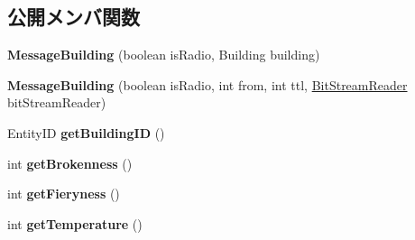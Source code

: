 \subsection*{公開メンバ関数}
\begin{DoxyCompactItemize}
\item 
\hypertarget{classadf_1_1agent_1_1communication_1_1standard_1_1bundle_1_1information_1_1MessageBuilding_adb36447846be8e6fbd72c54a3a97aff6}{}\label{classadf_1_1agent_1_1communication_1_1standard_1_1bundle_1_1information_1_1MessageBuilding_adb36447846be8e6fbd72c54a3a97aff6} 
{\bfseries Message\+Building} (boolean is\+Radio, Building building)
\item 
\hypertarget{classadf_1_1agent_1_1communication_1_1standard_1_1bundle_1_1information_1_1MessageBuilding_ae77a05a1e0a443311a38594a5071f396}{}\label{classadf_1_1agent_1_1communication_1_1standard_1_1bundle_1_1information_1_1MessageBuilding_ae77a05a1e0a443311a38594a5071f396} 
{\bfseries Message\+Building} (boolean is\+Radio, int from, int ttl, \hyperlink{classadf_1_1component_1_1communication_1_1util_1_1BitStreamReader}{Bit\+Stream\+Reader} bit\+Stream\+Reader)
\item 
\hypertarget{classadf_1_1agent_1_1communication_1_1standard_1_1bundle_1_1information_1_1MessageBuilding_ae1a24cb6c0fd82b65789574375afff4a}{}\label{classadf_1_1agent_1_1communication_1_1standard_1_1bundle_1_1information_1_1MessageBuilding_ae1a24cb6c0fd82b65789574375afff4a} 
Entity\+ID {\bfseries get\+Building\+ID} ()
\item 
\hypertarget{classadf_1_1agent_1_1communication_1_1standard_1_1bundle_1_1information_1_1MessageBuilding_a3fc5b91f416e39e96613b2f76d37f2ea}{}\label{classadf_1_1agent_1_1communication_1_1standard_1_1bundle_1_1information_1_1MessageBuilding_a3fc5b91f416e39e96613b2f76d37f2ea} 
int {\bfseries get\+Brokenness} ()
\item 
\hypertarget{classadf_1_1agent_1_1communication_1_1standard_1_1bundle_1_1information_1_1MessageBuilding_a806d08b34a2a2bf6192f6b6ae79370a0}{}\label{classadf_1_1agent_1_1communication_1_1standard_1_1bundle_1_1information_1_1MessageBuilding_a806d08b34a2a2bf6192f6b6ae79370a0} 
int {\bfseries get\+Fieryness} ()
\item 
\hypertarget{classadf_1_1agent_1_1communication_1_1standard_1_1bundle_1_1information_1_1MessageBuilding_af519f1347f235a1eabe448b7e62dd133}{}\label{classadf_1_1agent_1_1communication_1_1standard_1_1bundle_1_1information_1_1MessageBuilding_af519f1347f235a1eabe448b7e62dd133} 
int {\bfseries get\+Temperature} ()
\item 

\end{DoxyCompactItemize}
